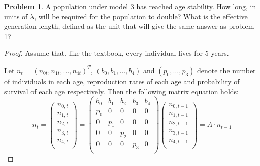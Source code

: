 \documentclass[12pt]{report}
\theoremstyle{definition}
\newtheorem{problem}{Problem}[chapter]
\begin{document}
    \begin{problem}
        A population under model 3 has reached age stability. 
        How long, in units of $\lambda$, will be required for the population to double? 
        What is the effective generation length, defined as the unit that will give the same answer as problem 1?

        \begin{proof}
            Assume that, like the textbook, every individual lives for 5 years.

            Let $n_t = (n_{0t}, n_{1t}, \ldots, n_{4t})^T$, $(b_0, b_1, \ldots, b_4)$ and $(p_0, \ldots, p_3)$ denote the number of individuals in each age, reproduction rates of each age and probability of survival of each age respectively.
            Then the following matrix equation holds:
            \begin{equation*}
                n_t = 
                \begin{pmatrix}
                    n_{0,t}\\
                    n_{1,t}\\
                    n_{2,t}\\
                    n_{3,t}\\
                    n_{4,t}\\
                \end{pmatrix} =  
                \begin{pmatrix}
                    b_0 & b_1 & b_2 & b_3 & b_4 \\
                    p_0 & 0 & 0 & 0 & 0\\
                    0 & p_1 & 0 & 0 & 0\\
                    0 & 0 & p_2 & 0 & 0\\
                    0 & 0 & 0 & p_3 & 0\\
                \end{pmatrix}
                \begin{pmatrix}
                    n_{0,t-1}\\
                    n_{1,t-1}\\
                    n_{2,t-1}\\
                    n_{3,t-1}\\
                    n_{4,t-1}\\
                \end{pmatrix} 
                = A \cdot n_{t-1}
            \end{equation*}


\end{proof}
\end{problem}
\end{document}
